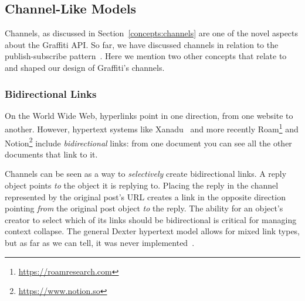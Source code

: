 \subsection{Channel-Like Models}

Channels, as discussed in Section~\ref{concepts:channels}
are one of the novel aspects about the Graffiti API.
So far, we have discussed channels in relation to the publish-subscribe
pattern~\cite{pubsub}.
Here we mention two other concepts that relate to and shaped our
design of Graffiti's channels.








\subsubsection{Bidirectional Links}

On the World Wide Web, hyperlinks point in one direction, from one website to another.
However, hypertext systems like Xanadu~\cite{xanadu}
and more recently Roam\footnote{\url{https://roamresearch.com}}
and Notion\footnote{\url{https://www.notion.so}}
include \emph{bidirectional} links:
from one document you can see all the other documents that link to it.

Channels can be seen as a way to \emph{selectively} create bidirectional links.
A reply object points \emph{to} the object it is replying to.
Placing the reply in the channel represented by the original post's URL
creates a link in the opposite direction
pointing \emph{from} the original post object \emph{to} the reply.
The ability for an object's creator to select which of its links should be bidirectional
is critical for managing context collapse.
The general Dexter hypertext model allows for mixed link types, but
as far as we can tell, it was never implemented~\cite{dexter}.

